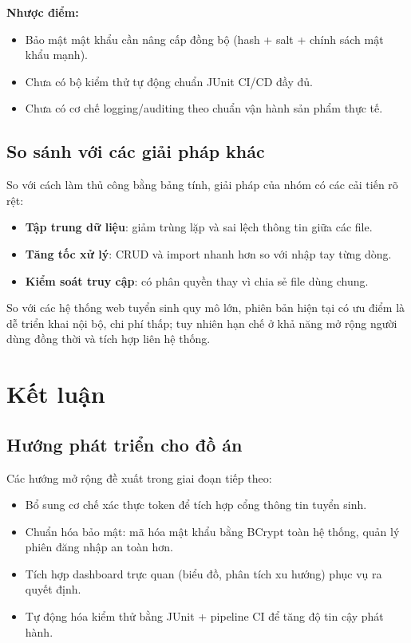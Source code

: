 \documentclass[12pt,a4paper,oneside]{report}
\begin{document}
\textbf{Nhược điểm:}
\begin{itemize}
  \item Bảo mật mật khẩu cần nâng cấp đồng bộ (hash + salt + chính sách mật khẩu mạnh).
  \item Chưa có bộ kiểm thử tự động chuẩn JUnit CI/CD đầy đủ.
  \item Chưa có cơ chế logging/auditing theo chuẩn vận hành sản phẩm thực tế.
\end{itemize}

\section{So sánh với các giải pháp khác}
So với cách làm thủ công bằng bảng tính, giải pháp của nhóm có các cải tiến rõ rệt:
\begin{itemize}
  \item \textbf{Tập trung dữ liệu}: giảm trùng lặp và sai lệch thông tin giữa các file.
  \item \textbf{Tăng tốc xử lý}: CRUD và import nhanh hơn so với nhập tay từng dòng.
  \item \textbf{Kiểm soát truy cập}: có phân quyền thay vì chia sẻ file dùng chung.
\end{itemize}

So với các hệ thống web tuyển sinh quy mô lớn, phiên bản hiện tại có ưu điểm là dễ triển khai nội bộ, chi phí thấp; tuy nhiên hạn chế ở khả năng mở rộng người dùng đồng thời và tích hợp liên hệ thống.

\chapter{Kết luận}
\section{Hướng phát triển cho đồ án}
Các hướng mở rộng đề xuất trong giai đoạn tiếp theo:
\begin{itemize}
  \item Bổ sung cơ chế xác thực token để tích hợp cổng thông tin tuyển sinh.
  \item Chuẩn hóa bảo mật: mã hóa mật khẩu bằng BCrypt toàn hệ thống, quản lý phiên đăng nhập an toàn hơn.
  \item Tích hợp dashboard trực quan (biểu đồ, phân tích xu hướng) phục vụ ra quyết định.
  \item Tự động hóa kiểm thử bằng JUnit + pipeline CI để tăng độ tin cậy phát hành.
\end{itemize}
\end{document}

